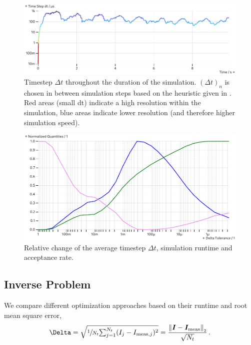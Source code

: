 \begin{figure}
  \includegraphics[width=\columnwidth]{../figures/results/dt-plot.pdf}
  \caption{Timestep $\Delta t$ throughout the duration of the simulation. $(\Delta t)_n$ is chosen in between simulation steps based on the heuristic given in . Red areas (small dt) indicate a high resolution within the simulation, blue areas indicate lower resolution (and therefore higher simulation speed).}
  \label{figure:dt-plot}
\end{figure}

\begin{figure}
  \includegraphics[width=\columnwidth]{../figures/results/delta-tolerance.pdf}
  \caption{Relative change of the average timestep $\Delta t$, simulation runtime and acceptance rate.}
  \label{figure:delta-tolerance}
\end{figure}

\subsection{Inverse Problem}
We compare different optimization approaches based on their runtime and root mean square error,
$$\Delta = \sqrt{\sfrac{1}{N_t} {\textstyle \sum_{j=1}^{N_t}} (I_j - I_{{\rm meas}, j})^2} = \frac{\norm{\vec{I} - \vec{I}_{\rm meas}}}{\sqrt{N_t}}\,.$$

